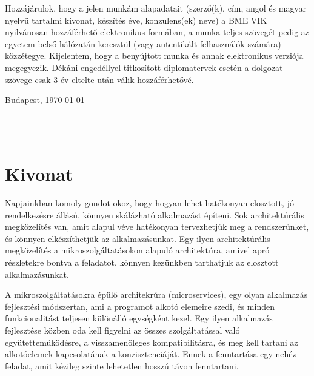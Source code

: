 \documentclass[11pt,magyar,a4paper,twoside,]{report}
\begin{document}
Hozzájárulok, hogy a jelen munkám alapadatait (szerző(k), cím, angol és magyar nyelvű tartalmi kivonat, készítés éve, konzulens(ek) neve) a BME VIK nyilvánosan hozzáférhető elektronikus formában, a munka teljes szövegét pedig az egyetem belső hálózatán keresztül (vagy autentikált felhasználók számára) közzétegye. Kijelentem, hogy a benyújtott munka és annak elektronikus verziója megegyezik. Dékáni engedéllyel titkosított diplomatervek esetén a dolgozat szövege csak 3 év eltelte után válik hozzáférhetővé.

\begin{flushleft}
\vspace*{1cm}
Budapest, \today
\end{flushleft}

\begin{flushright}
 \vspace*{1cm}
 \makebox[7cm]{\rule{6cm}{.4pt}}\\
 \\
\end{flushright}
\thispagestyle{empty}

\vfill
\clearpage
\thispagestyle{empty} %

\chapter*{Kivonat}\label{kivonat}

Napjainkban komoly gondot okoz, hogy hogyan lehet hatékonyan elosztott,
jó rendelkezésre állású, könnyen skálázható alkalmazást építeni. Sok
architektúrális megközelítés van, amit alapul véve hatékonyan
tervezhetjük meg a rendszerünket, és könnyen elkészíthetjük az
alkalmazásunkat. Egy ilyen architektúrális megközelítés a
mikroszolgáltatásokon alapuló architektúra, amivel apró részletekre
bontva a feladatot, könnyen kezünkben tarthatjuk az elosztott
alkalmazásunkat.

A mikroszolgáltatásokra épülő architekrúra (microservices), egy olyan
alkalmazás fejlesztési módszertan, ami a programot alkotó elemeire
szedi, és minden funkcionalitást teljesen különálló egységként kezel.
Egy ilyen alkalmazás fejlesztése közben oda kell figyelni az összes
szolgáltatással való együtetteműködésre, a visszamenőleges
kompatibilitásra, és meg kell tartani az alkotóelemek kapcsolatának a
konzisztenciáját. Ennek a fenntartása egy nehéz feladat, amit kézileg
szinte lehetetlen hosszú távon fenntartani.
\end{document}
